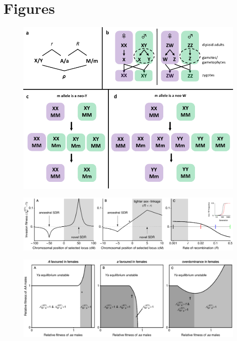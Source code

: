 \documentclass[12pt]{article}
\begin{document}
\section*{Figures}

\begin{figure}[!h]
\centering
\centerline{\includegraphics[width=\linewidth]{Sex_determination_outline.pdf}}
\caption{}
\end{figure}

\begin{figure}[!h]
\centering
\centerline{\includegraphics[width=\linewidth]{PositionPlot_SexAntagTighter.eps}}
\caption{}
\end{figure}

\begin{figure}[!h]
\centering
\centerline{\includegraphics[width=\linewidth]{Region_plot_combined.eps}}
\caption{}
\end{figure}
\end{document}
